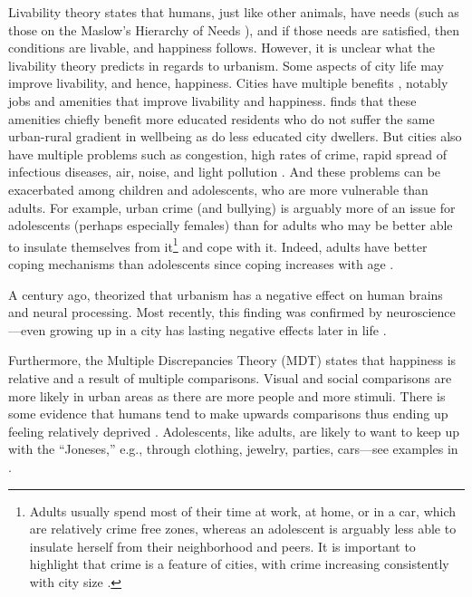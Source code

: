 \documentclass[11pt, letterpaper]{article}
\begin{document}
\begin{spacing}{1.9}
Livability theory \citep{veenhoven95,veenhoven14b,veenhoven00b} states that humans, just like other animals, have needs (such as those on the Maslow's Hierarchy of Needs \citep{maslow87}), and if those needs are satisfied, then conditions are livable, and happiness follows. 
However, it is unclear what the livability theory predicts in regards to urbanism. Some aspects of city life may improve livability, and hence, happiness. Cities have multiple benefits  \citep{meyer13,florida08,glaeser11,osullivan09}, notably jobs and amenities that improve livability and
happiness. \citet{morrison2024resolving}  finds that these amenities chiefly
benefit more educated residents who do not suffer the same urban-rural gradient
in wellbeing as do less educated city dwellers. But cities also  have multiple problems such as congestion, high
 rates of crime, rapid spread of infectious diseases, air, noise, and light
 pollution 
   \citep{bettencourt10b,bettencourt07,meyer13,aokCityBook15,aok21}.
And these problems can be  exacerbated among children and adolescents, who are
more vulnerable than adults. For example, urban crime (and bullying) is arguably
more of an issue for adolescents (perhaps especially females) than for adults
who may be better able to insulate themselves from it\footnote{Adults usually
  spend most of their  time at work, at home, or in a car, which are relatively
  crime free zones, whereas an adolescent is arguably less able to insulate
  herself from their neighborhood and peers. It is important to highlight that
  crime is a feature of cities, with crime increasing consistently with city size \citep{blissCL_nov4_14,bettencourt13,bettencourt10,bettencourt10b,bettencourt07}.}
 and cope with it. Indeed,  adults have better coping mechanisms than adolescents since coping increases with age \citep{leipold2019coping}. 

A century ago, \cite{simmel03} theorized that urbanism has a negative effect on human brains and neural processing. Most recently, this finding was confirmed by neuroscience---even growing up in a city has lasting negative effects later in life \citep{lederbogen11}. 
   
Furthermore, the Multiple Discrepancies Theory (MDT)
\citep{michalos85,michalos14c} states that happiness is relative and a result of
multiple comparisons. Visual and social comparisons are more likely in urban
areas as there are more people and more stimuli. There is some evidence that
humans tend to make upwards comparisons \citep{frey02s} thus ending up feeling
relatively deprived \citep[e.g.,][]{luttmer05,frank12}. Adolescents, like
adults, are likely to want to keep up with the ``Joneses,''  e.g., through clothing, jewelry, parties, cars---see examples in \citet{frank12}. 
 

\end{spacing}
\end{document}

